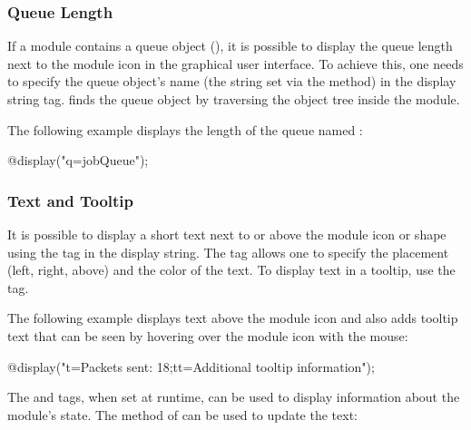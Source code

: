 \subsubsection{Queue Length}
\label{sec:graphics:submodule-queue-length}

If a module contains a queue object (), it is possible to display
the queue length next to the module icon in the graphical user interface. To
achieve this, one needs to specify the queue object's name (the string set via
the  method) in the  display string tag. {\opp} finds
the queue object by traversing the object tree inside the module.

The following example displays the length of the queue named :

\begin{ned}
@display("q=jobQueue");
\end{ned}

\begin{center}
\end{center}

\subsubsection{Text and Tooltip}
\label{sec:graphics:submdule-text-and-tooltip}

It is possible to display a short text next to or above the module icon or shape
using the  tag in the display string. The tag allows one to specify the
placement (left, right, above) and the color of the text. To display text in a
tooltip, use the  tag.

The following example displays text above the module icon and also adds tooltip
text that can be seen by hovering over the module icon with the mouse:

\begin{ned}
@display("t=Packets sent: 18;tt=Additional tooltip information");
\end{ned}

\begin{center}
\end{center}

\begin{note}
  The  and  tags, when set at runtime, can be used to display
  information about the module's state. The  method
  of  can be used to update the text:
\end{note}

